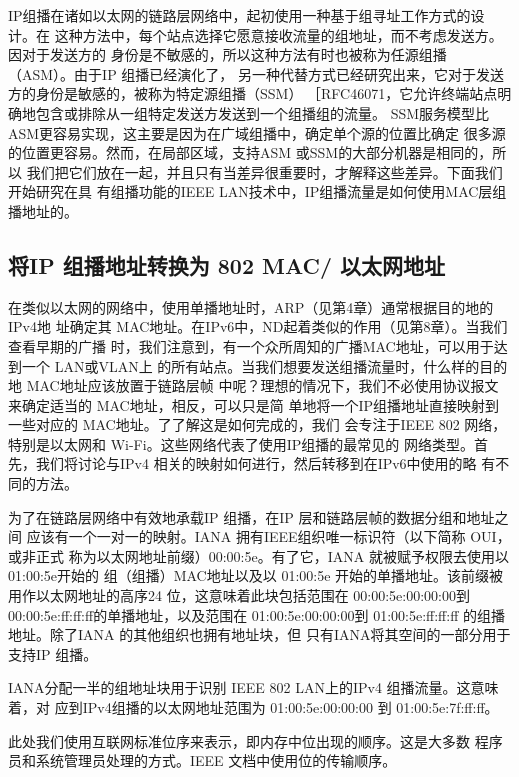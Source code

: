 IP组播在诸如以太网的链路层网络中，起初使用一种基于组寻址工作方式的设计。在
这种方法中，每个站点选择它愿意接收流量的组地址，而不考虑发送方。因对于发送方的
身份是不敏感的，所以这种方法有时也被称为任源组播（ASM）。由于IP 组播已经演化了，
另一种代替方式已经研究出来，它对于发送方的身份是敏感的，被称为特定源组播（SSM）
［RFC46071，它允许终端站点明确地包含或排除从一组特定发送方发送到一个组播组的流量。
SSM服务模型比 ASM更容易实现，这主要是因为在广域组播中，确定单个源的位置比确定
很多源的位置更容易。然而，在局部区域，支持ASM 或SSM的大部分机器是相同的，所以
我们把它们放在一起，并且只有当差异很重要时，才解释这些差异。下面我们开始研究在具
有组播功能的IEEE LAN技术中，IP组播流量是如何使用MAC层组播地址的。

\subsection{将IP 组播地址转换为 802 MAC/ 以太网地址}

在类似以太网的网络中，使用单播地址时，ARP（见第4章）通常根据目的地的IPv4地
址确定其 MAC地址。在IPv6中，ND起着类似的作用（见第8章）。当我们查看早期的广播
时，我们注意到，有一个众所周知的广播MAC地址，可以用于达到一个 LAN或VLAN上
的所有站点。当我们想要发送组播流量时，什么样的目的地 MAC地址应该放置于链路层帧
中呢？理想的情况下，我们不必使用协议报文来确定适当的 MAC地址，相反，可以只是简
单地将一个IP组播地址直接映射到一些对应的 MAC地址。了了解这是如何完成的，我们
会专注于IEEE 802 网络，特别是以太网和 Wi-Fi。这些网络代表了使用IP组播的最常见的
网络类型。首先，我们将讨论与IPv4 相关的映射如何进行，然后转移到在IPv6中使用的略
有不同的方法。

为了在链路层网络中有效地承载IP 组播，在IP 层和链路层帧的数据分组和地址之间
应该有一个一对一的映射。IANA 拥有IEEE组织唯一标识符（以下简称 OUI，或非正式
称为以太网地址前缀）00:00:5e。有了它，IANA 就被赋予权限去使用以01:00:5e开始的
组（组播）MAC地址以及以 01:00:5e 开始的单播地址。该前缀被用作以太网地址的高序24
位，这意味着此块包括范围在 00:00:5e:00:00:00到 00:00:5e:ff:ff:ff的单播地址，以及范围在
01:00:5e:00:00:00到 01:00:5e:ff:ff:ff 的组播地址。除了IANA 的其他组织也拥有地址块，但
只有IANA将其空间的一部分用于支持IP 组播。

IANA分配一半的组地址块用于识别 IEEE 802 LAN上的IPv4 组播流量。这意味着，对
应到IPv4组播的以太网地址范围为 01:00:5e:00:00:00 到 01:00:5e:7f:ff:ff。

\begin{tcolorbox}
  此处我们使用互联网标准位序来表示，即内存中位出现的顺序。这是大多数
  程序员和系统管理员处理的方式。IEEE 文档中使用位的传输顺序。
\end{tcolorbox}


